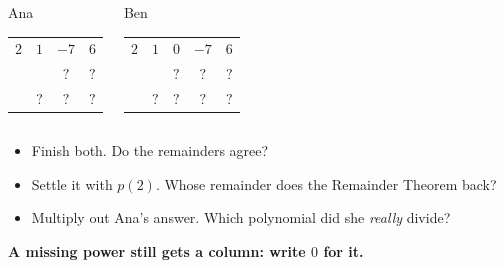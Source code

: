 \documentclass[aspectratio=169, 11pt]{beamer}
\begin{document}
\begin{frame}[t, plain]

  \begin{columns}[T]
      \begin{block}{Ana}
        \begin{center}
        {\large\setlength{\tabcolsep}{6pt}\begin{tabular}{c|ccc}
          $2$ & $1$ & $-7$ & $6$ \\
              &     & $?$  & $?$ \\ \hline
              & $?$ & $?$  & $?$ \\
        \end{tabular}}
        \end{center}
      \end{block}
      \begin{block}{Ben}
        \begin{center}
        {\large\setlength{\tabcolsep}{6pt}\begin{tabular}{c|cccc}
          $2$ & $1$ & $0$ & $-7$ & $6$ \\
              &     & $?$ & $?$  & $?$ \\ \hline
              & $?$ & $?$ & $?$  & $?$ \\
        \end{tabular}}
        \end{center}
      \end{block}
  \end{columns}

  \bigskip
  \begin{itemize}\setlength{\itemsep}{5pt}
    \item Finish both. Do the remainders agree?
    \item Settle it with $p(2)$. Whose remainder does the Remainder Theorem back?
    \item Multiply out Ana's answer. Which polynomial did she \emph{really} divide?
  \end{itemize}

  \medskip
  \textbf{A missing power still gets a column: write $0$ for it.}
\end{frame}
\end{document}
